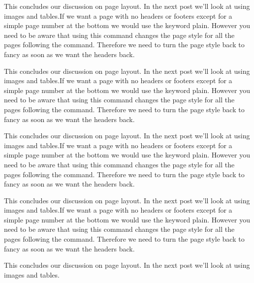 This concludes our discussion on page layout. In the next post we'll look at using images and tables.If we want a page with no headers or footers except for a simple page number at the bottom we would use the keyword plain. However you need to be aware that using this command changes the page style for all the pages following the command. Therefore we need to turn the page style back to fancy as soon as we want the headers back.

This concludes our discussion on page layout. In the next post we'll look at using images and tables.If we want a page with no headers or footers except for a simple page number at the bottom we would use the keyword plain. However you need to be aware that using this command changes the page style for all the pages following the command. Therefore we need to turn the page style back to fancy as soon as we want the headers back.

This concludes our discussion on page layout. In the next post we'll look at using images and tables.If we want a page with no headers or footers except for a simple page number at the bottom we would use the keyword plain. However you need to be aware that using this command changes the page style for all the pages following the command. Therefore we need to turn the page style back to fancy as soon as we want the headers back.

This concludes our discussion on page layout. In the next post we'll look at using images and tables.If we want a page with no headers or footers except for a simple page number at the bottom we would use the keyword plain. However you need to be aware that using this command changes the page style for all the pages following the command. Therefore we need to turn the page style back to fancy as soon as we want the headers back.

This concludes our discussion on page layout. In the next post we'll look at using images and tables.